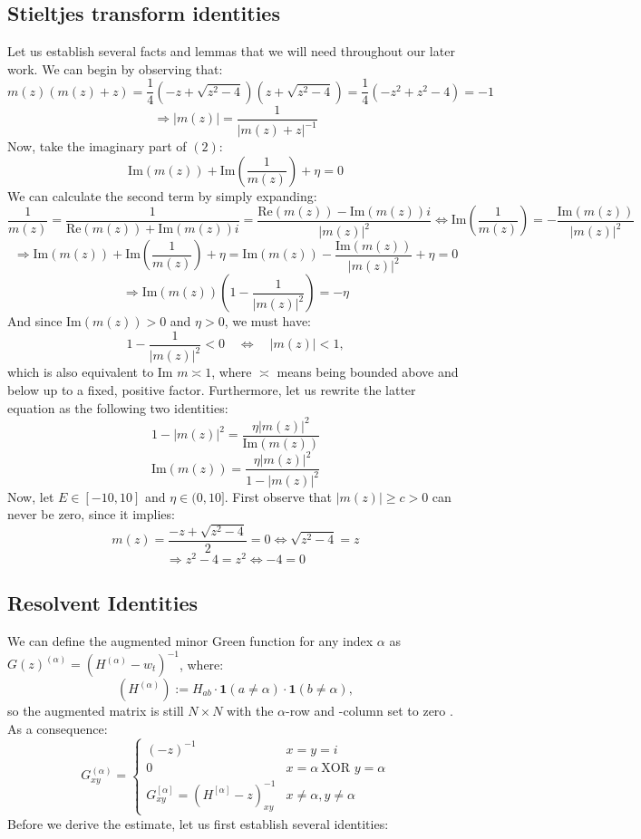 \documentclass[11pt]{article}
\begin{document}
\subsection*{Stieltjes transform identities}
Let us establish several facts and lemmas that we will need throughout our later work. We can begin by observing that: $$m(z)(m(z)+z) = \frac{1}{4}(-z+\sqrt{z^2-4})(z+\sqrt{z^2-4})=\frac{1}{4}(-z^2+z^2-4)=-1$$
$$\Rightarrow |m(z)| = \frac{1}{|m(z)+z|^{-1}}$$
Now, take the imaginary part of $(2)$: $$\text{Im}(m(z)) + \text{Im}\left(\frac{1}{m(z)}\right)+\eta=0$$
We can calculate the second term by simply expanding: $$\frac{1}{m(z)} = \frac{1}{\text{Re}(m(z))+\text{Im}(m(z))i} = \frac{\text{Re}(m(z))-\text{Im}(m(z))i}{|m(z)|^2}\Leftrightarrow \text{Im}\left(\frac{1}{m(z)}\right) = -\frac{\text{Im}(m(z))}{|m(z)|^2}$$
$$\Rightarrow\text{Im}(m(z)) + \text{Im}\left(\frac{1}{m(z)}\right)+\eta=\text{Im}(m(z)) -\frac{\text{Im}(m(z))}{|m(z)|^2}+\eta=0$$
$$\Rightarrow \text{Im}(m(z))\left(1-\frac{1}{|m(z)|^2}\right)=-\eta$$
And since $\text{Im}(m(z))>0$ and $\eta>0$, we must have:
\begin{equation*}\label{2.1} 1-\frac{1}{|m(z)|^2}<0\quad \Leftrightarrow\quad |m(z)|<1, \tag{2.1}
\end{equation*}
which is also equivalent to $\text{Im }m \asymp 1$, where $\asymp$ means being bounded above and below up to a fixed, positive factor. Furthermore, let us rewrite the latter equation as the following two identities: \begin{equation*}\label{2.2}1-|m(z)|^2 = \frac{\eta|m(z)|^2}{\text{Im}(m(z))}
\tag{2.2}
\end{equation*}
\begin{equation*}\label{2.3}\text{Im}(m(z))= \frac{\eta|m(z)|^2}{1-|m(z)|^2 }
\tag{2.3}
\end{equation*}
Now, let $E\in [-10, 10]$ and $\eta\in (0, 10]$. First observe that $|m(z)|\geq c>0$ can never be zero, since it implies: $$m(z) = \frac{-z+\sqrt{z^2-4}}{2}=0 \Leftrightarrow \sqrt{z^2-4}=z$$
$$\Rightarrow z^2-4=z^2\Leftrightarrow -4=0$$ 





\subsection*{Resolvent Identities}
We can define the augmented minor Green function for any index $\alpha$ as $G(z)^{(\alpha)} = (H^{(\alpha)}-w_t)^{-1}$, where: $$\left(H^{(\alpha)}\right):=H_{ab}\cdot \mathbf{1}(a\neq \alpha)\cdot \mathbf{1}(b\neq \alpha),$$ 
so the augmented matrix is still $N\times N$ with the $\alpha$-row and -column set to zero \cite{dynamic}. As a consequence: 
\begin{equation*}
G_{xy}^{(\alpha)} = \left\{\begin{array}{cc}
  (-z)^{-1}  & x=y=i\\
  0 & x=\alpha\ \text{XOR } y = \alpha\\
  G_{xy}^{[\alpha]} = (H^{[\alpha]}-z)_{xy}^{-1} & x\neq \alpha, y\neq \alpha
  \end{array}
  \right.
\end{equation*}
Before we derive the estimate, let us first establish several identities:
\end{document}

